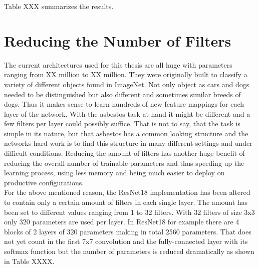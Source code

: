 Table XXX summarizes the results.

\begin{table}[h] \centering
{}
\caption{Resnet18 FiveCrop Implementation with and without pre-training. FINAL (regular) means ResNet18 with the resizing of the image instead of cropping and averaging}
\label{tbl:resnet18-randomnine}
\end{table}

\section{Reducing the Number of Filters}

The current architectures used for this thesis are all huge with parameters ranging from XX million to XX million. They were originally built to classify a variety of different objects found in ImageNet. Not only object as cars and dogs needed to be distinguished but also different and sometimes similar breeds of dogs. Thus it makes sense to learn hundreds of new feature mappings for each layer of the network. With the asbestos task at hand it might be different and a few filters per layer could possibly suffice. That is not to say, that the task is simple in its nature, but that asbestos has a common looking structure and the networks hard work is to find this structure in many different settings and under difficult conditions. Reducing the amount of filters has another huge benefit of reducing the overall number of trainable parameters and thus speeding up the learning process, using less memory and being much easier to deploy on productive configurations.\\

For the above mentioned reason, the ResNet18 implementation has been altered to contain only a certain amount of filters in each single layer. The amount has been set to different values ranging from 1 to 32 filters. With 32 filters of size 3x3 only 320 parameters are used per layer. In ResNet18 for example there are 4 blocks of 2 layers of 320 parameters making in total 2560 parameters. That does not yet count in the first 7x7 convolution and the fully-connected layer with its softmax function but the number of parameters is reduced dramatically as shown in Table XXXX.


